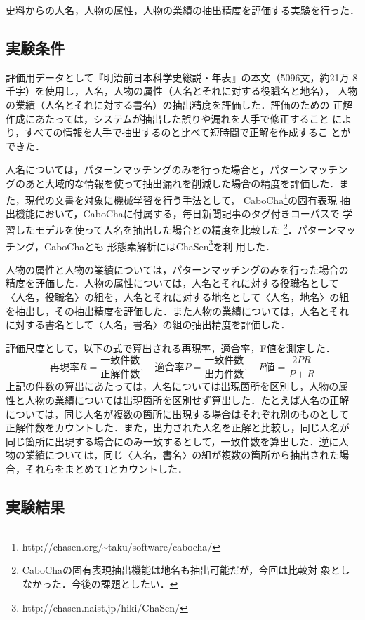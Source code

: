 \documentclass[japanese]{jnlp_1.4}
\begin{document}
史料からの人名，人物の属性，人物の業績の抽出精度を評価する実験を行った．


\subsection{実験条件}

評価用データとして『明治前日本科学史総説・年表』の本文（5096文，約21万
8千字）を使用し，人名，人物の属性（人名とそれに対する役職名と地名），
人物の業績（人名とそれに対する書名）の抽出精度を評価した．評価のための
正解作成にあたっては，システムが抽出した誤りや漏れを人手で修正すること
により，すべての情報を人手で抽出するのと比べて短時間で正解を作成するこ
とができた．

人名については，パターンマッチングのみを行った場合と，パターンマッチン
グのあと大域的な情報を使って抽出漏れを削減した場合の精度を評価した．ま
た，現代の文書を対象に機械学習を行う手法として，
CaboCha\footnote{http://chasen.org/\~{}taku/software/cabocha/}の固有表現
抽出機能において，CaboChaに付属する，毎日新聞記事のタグ付きコーパスで
学習したモデルを使って人名を抽出した場合との精度を比較した
\footnote{CaboChaの固有表現抽出機能は地名も抽出可能だが，今回は比較対
象としなかった．今後の課題としたい．}．パターンマッチング，CaboChaとも
形態素解析にはChaSen\footnote{http://chasen.naist.jp/hiki/ChaSen/}を利
用した．

人物の属性と人物の業績については，パターンマッチングのみを行った場合の
精度を評価した．人物の属性については，人名とそれに対する役職名として
〈人名，役職名〉の組を，人名とそれに対する地名として〈人名，地名〉の組
を抽出し，その抽出精度を評価した．また人物の業績については，人名とそれ
に対する書名として〈人名，書名〉の組の抽出精度を評価した．

評価尺度として，以下の式で算出される再現率，適合率，F値を測定した．
\[
再現率R = \frac{一致件数}{正解件数}, \hspace{1em}
適合率P = \frac{一致件数}{出力件数}, \hspace{1em}
F値 = \frac{2PR}{P+R}
\]
上記の件数の算出にあたっては，人名については出現箇所を区別し，人物の属
性と人物の業績については出現箇所を区別せず算出した．たとえば人名の正解
については，同じ人名が複数の箇所に出現する場合はそれぞれ別のものとして
正解件数をカウントした．また，出力された人名を正解と比較し，同じ人名が
同じ箇所に出現する場合にのみ一致するとして，一致件数を算出した．逆に人
物の業績については，同じ〈人名，書名〉の組が複数の箇所から抽出された場
合，それらをまとめて1とカウントした．


\subsection{実験結果}
\end{document}
